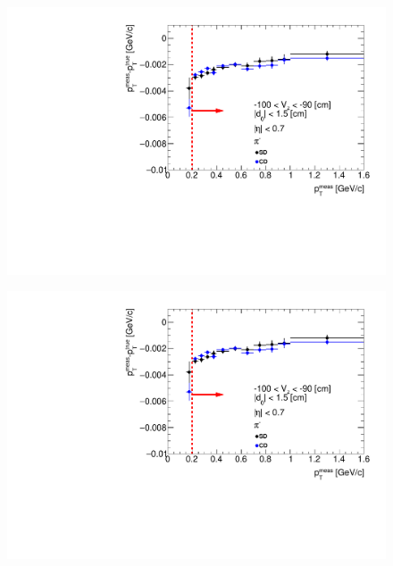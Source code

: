 \begin{figure}[H]
{  \includegraphics[width=\linewidth,page=157]{graphics/energyLoss/energyLoss3D_OnePrtAlso.pdf}\\
}%
\end{figure}

\begin{figure}[H]\ContinuedFloat
\vspace{-3.5em}
\parbox{0.329\textwidth}{
  \includegraphics[width=\linewidth,page=158]{graphics/energyLoss/energyLoss3D_OnePrtAlso.pdf}\\
  \vspace{-4em}
}~
\end{figure}